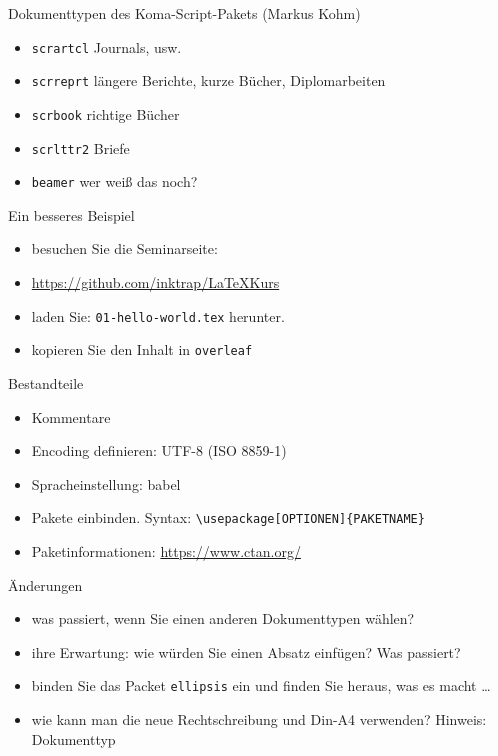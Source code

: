 
\begin{frame}{Dokumenttypen des Koma-Script-Pakets (Markus Kohm)}

\begin{itemize}
\itemsep1pt\parskip0pt
\item
  \texttt{scrartcl} Journals, usw.
\item
  \texttt{scrreprt} längere Berichte, kurze Bücher, Diplomarbeiten
\item
  \texttt{scrbook} richtige Bücher
\item
  \texttt{scrlttr2} Briefe
\item
  \texttt{beamer} wer weiß das noch?
\end{itemize}

\end{frame}

\begin{frame}{Ein besseres Beispiel}

\begin{itemize}
\itemsep1pt\parskip0pt
\item besuchen Sie die Seminarseite:
\item
  \url{https://github.com/inktrap/LaTeXKurs}
\item
  laden Sie: \texttt{01-hello-world.tex} herunter.
\item
  kopieren Sie den Inhalt in \texttt{overleaf}
\end{itemize}

\end{frame}

\begin{frame}{Bestandteile}

\begin{itemize}
\itemsep1pt\parskip0pt
\item
  Kommentare
\item
  Encoding definieren: UTF-8 (ISO 8859-1)
\item
  Spracheinstellung: babel
\item
  Pakete einbinden. Syntax:
  \texttt{\textbackslash{}usepackage{[}OPTIONEN{]}\{PAKETNAME\}}
\item
  Paketinformationen: \url{https://www.ctan.org/}
\end{itemize}

\end{frame}

\begin{frame}{Änderungen}

\begin{itemize}
\itemsep1pt\parskip0pt
\item
  was passiert, wenn Sie einen anderen Dokumenttypen wählen?
\item
  ihre Erwartung: wie würden Sie einen Absatz einfügen? Was passiert?
\item
  binden Sie das Packet \texttt{ellipsis} ein und finden Sie heraus, was
  es macht \ldots{}
\item
  wie kann man die neue Rechtschreibung und Din-A4 verwenden? Hinweis:
  Dokumenttyp
\end{itemize}
\end{frame}


